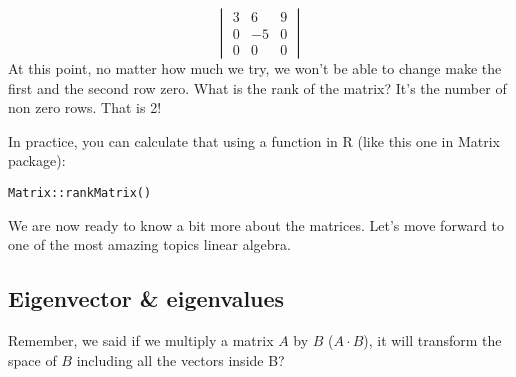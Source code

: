 \documentclass[
]{book}
\theoremstyle{definition}
\theoremstyle{definition}
\theoremstyle{definition}
\theoremstyle{remark}
\begin{document}
\[\begin{vmatrix} 3&6&9\\0&-5&0\\0&0&0\end{vmatrix}\]
At this point, no matter how much we try, we won't be able to change make the first and the second row zero. What is the rank of the matrix? It's the number of non zero rows. That is 2!

In practice, you can calculate that using a function in R (like this one in Matrix package):

\begin{verbatim}
Matrix::rankMatrix()
\end{verbatim}

We are now ready to know a bit more about the matrices. Let's move forward to one of the most amazing topics linear algebra.

\hypertarget{eigenvector-eigenvalues}{%
\subsection{Eigenvector \& eigenvalues}\label{eigenvector-eigenvalues}}

Remember, we said if we multiply a matrix \(A\) by \(B\) (\(A\cdot B\)), it will transform the space of \(B\) including all the vectors inside B?
\end{document}
